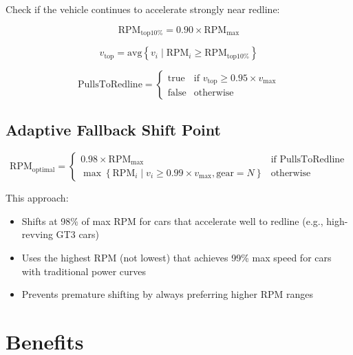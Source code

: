 \documentclass[12pt]{article}
\begin{document}
Check if the vehicle continues to accelerate strongly near redline:

\begin{equation}
\text{RPM}_{\text{top10\%}} = 0.90 \times \text{RPM}_{\max}
\end{equation}

\begin{equation}
v_{\text{top}} = \text{avg}\left\{v_i \mid \text{RPM}_i \geq \text{RPM}_{\text{top10\%}}\right\}
\end{equation}

\begin{equation}
\text{PullsToRedline} = \begin{cases}
\text{true} & \text{if } v_{\text{top}} \geq 0.95 \times v_{\max} \\
\text{false} & \text{otherwise}
\end{cases}
\end{equation}

\subsection{Adaptive Fallback Shift Point}

\begin{equation}
\text{RPM}_{\text{optimal}} = \begin{cases}
0.98 \times \text{RPM}_{\max} & \text{if PullsToRedline} \\
\max \left\{ \text{RPM}_i \mid v_i \geq 0.99 \times v_{\max}, \text{gear} = N \right\} & \text{otherwise}
\end{cases}
\end{equation}

This approach:
\begin{itemize}
    \item Shifts at 98\% of max RPM for cars that accelerate well to redline (e.g., high-revving GT3 cars)
    \item Uses the highest RPM (not lowest) that achieves 99\% max speed for cars with traditional power curves
    \item Prevents premature shifting by always preferring higher RPM ranges
\end{itemize}

\section{Benefits}
\end{document}

